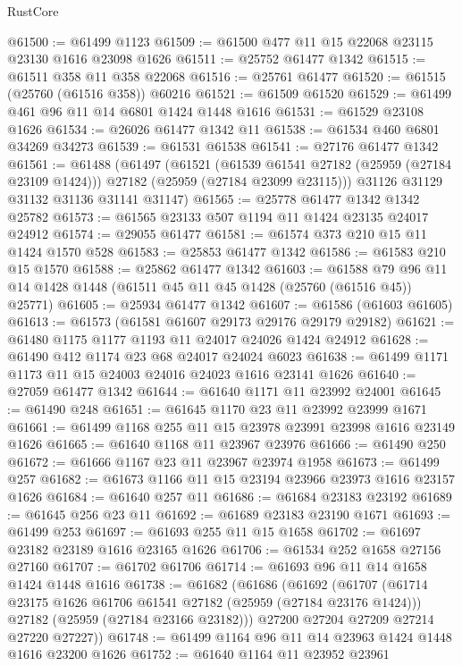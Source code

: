 \begin{lexlean}{RustCore}
\begin{coremodule}
@61500 := @61499 @1123
@61509 := @61500 @477 @11 @15 @22068 @23115 @23130 @1616 @23098 @1626
@61511 := @25752 @61477 @1342
@61515 := @61511 @358 @11 @358 @22068
@61516 := @25761 @61477
@61520 := @61515 (@25760 (@61516 @358)) @60216
@61521 := @61509 @61520
@61529 := @61499 @461 @96 @11 @14 @6801 @1424 @1448 @1616
@61531 := @61529 @23108 @1626
@61534 := @26026 @61477 @1342 @11
@61538 := @61534 @460 @6801 @34269 @34273
@61539 := @61531 @61538
@61541 := @27176 @61477 @1342
@61561 := @61488
    (@61497
      (@61521
        (@61539 @61541 @27182 (@25959 (@27184 @23109 @1424)))
        @27182
        (@25959 (@27184 @23099 @23115)))
      @31126
      @31129
      @31132
      @31136
      @31141
      @31147)
@61565 := @25778 @61477 @1342 @1342 @25782
@61573 := @61565 @23133 @507 @1194 @11 @1424 @23135 @24017 @24912
@61574 := @29055 @61477
@61581 := @61574 @373 @210 @15 @11 @1424 @1570 @528
@61583 := @25853 @61477 @1342
@61586 := @61583 @210 @15 @1570
@61588 := @25862 @61477 @1342
@61603 := @61588 @79 @96 @11 @14 @1428 @1448 (@61511 @45 @11 @45 @1428 (@25760 (@61516 @45)) @25771)
@61605 := @25934 @61477 @1342
@61607 := @61586 (@61603 @61605)
@61613 := @61573 (@61581 @61607 @29173 @29176 @29179 @29182)
@61621 := @61480 @1175 @1177 @1193 @11 @24017 @24026 @1424 @24912
@61628 := @61490 @412 @1174 @23 @68 @24017 @24024 @6023
@61638 := @61499 @1171 @1173 @11 @15 @24003 @24016 @24023 @1616 @23141 @1626
@61640 := @27059 @61477 @1342
@61644 := @61640 @1171 @11 @23992 @24001
@61645 := @61490 @248
@61651 := @61645 @1170 @23 @11 @23992 @23999 @1671
@61661 := @61499 @1168 @255 @11 @15 @23978 @23991 @23998 @1616 @23149 @1626
@61665 := @61640 @1168 @11 @23967 @23976
@61666 := @61490 @250
@61672 := @61666 @1167 @23 @11 @23967 @23974 @1958
@61673 := @61499 @257
@61682 := @61673 @1166 @11 @15 @23194 @23966 @23973 @1616 @23157 @1626
@61684 := @61640 @257 @11
@61686 := @61684 @23183 @23192
@61689 := @61645 @256 @23 @11
@61692 := @61689 @23183 @23190 @1671
@61693 := @61499 @253
@61697 := @61693 @255 @11 @15 @1658
@61702 := @61697 @23182 @23189 @1616 @23165 @1626
@61706 := @61534 @252 @1658 @27156 @27160
@61707 := @61702 @61706
@61714 := @61693 @96 @11 @14 @1658 @1424 @1448 @1616
@61738 := @61682
    (@61686
      (@61692
        (@61707
          (@61714 @23175 @1626 @61706 @61541 @27182 (@25959 (@27184 @23176 @1424)))
          @27182
          (@25959 (@27184 @23166 @23182)))
        @27200
        @27204
        @27209
        @27214
        @27220
        @27227))
@61748 := @61499 @1164 @96 @11 @14 @23963 @1424 @1448 @1616 @23200 @1626
@61752 := @61640 @1164 @11 @23952 @23961

\end{coremodule}
\end{lexlean}
